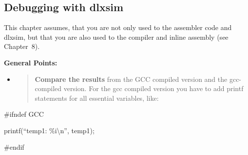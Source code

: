 \hypertarget{debugging-with-dlxsim}{%
\subsection{Debugging with dlxsim}\label{debugging-with-dlxsim}}

This chapter assumes, that you are not only used to the assembler code
and dlxsim, but that you are also used to the compiler and inline
assembly (see Chapter~8).

\textbf{General Points:}

\begin{itemize}
\item
  \begin{quote}
  \textbf{Compare the results} from the GCC compiled version and the
  gcc-compiled version. For the gcc compiled version you have to add
  printf statements for all essential variables, like:
  \end{quote}
\end{itemize}

\#ifndef GCC

printf(``temp1: \%i\textbackslash n'', temp1);

\#endif

